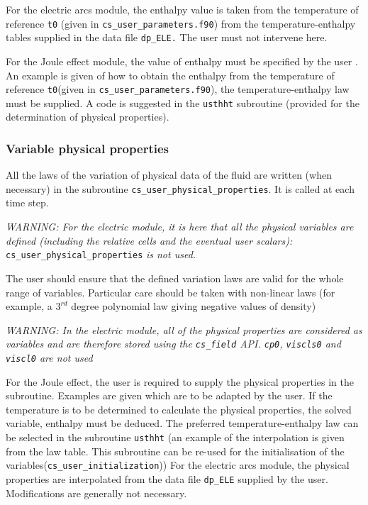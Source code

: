 {{{\begin{list}{-}{}
\item For the electric arcs module, the enthalpy value is taken from the temperature
 of reference \texttt{t0} (given in \texttt{cs\_user\_parameters.f90}) from the temperature-enthalpy
 tables
 supplied in the data file \texttt{dp\_ELE.} The user must not intervene here.
\item For the Joule effect module, the value of enthalpy must be specified by the user
. An example is given of how to obtain the enthalpy from the temperature of reference
 \texttt{t0}(given in \texttt{cs\_user\_parameters.f90}), the temperature-enthalpy law must be
supplied. A code is suggested in the \texttt{usthht} subroutine (provided for
 the determination of physical properties).
\end{list}

\subsubsection{Variable physical properties}

All the laws of the variation of physical data of the fluid are written (when necessary)
in the subroutine \texttt{cs\_user\_physical\_properties}. It is called at each time step.

{\em WARNING: For the electric module, it is here that all the physical variables are defined
 (including the relative cells and the eventual user scalars):} \texttt{cs\_user\_physical\_properties} {\em {is not used.}}

The user should ensure that the defined variation laws are valid for the whole range of
variables. Particular care should be taken with non-linear laws (for example, a
 $3^{rd}$ degree polynomial law giving negative values of density)

{\em WARNING: In the electric module, all of the physical properties are considered as variables
 and are therefore stored using the \texttt{cs\_field} API. \texttt{cp0}, \texttt{viscls0} and \texttt{viscl0}
 are not used}

For the Joule effect, the user is required to supply the physical properties in the
subroutine. Examples are given which are to be adapted by the user. If the temperature is
to be determined to calculate the physical properties, the solved variable, enthalpy must
 be deduced. The preferred temperature-enthalpy law can be selected in the subroutine
 \texttt{usthht} (an example of the interpolation is given from the law table. This
subroutine can be re-used for the initialisation of the variables(\texttt{cs\_user\_initialization}))
 For the electric arcs module, the physical properties are interpolated from the data file
 \texttt{dp\_ELE} supplied by the user. Modifications are generally not necessary.

}}}
